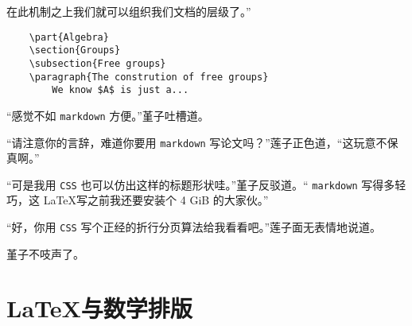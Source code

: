 在此机制之上我们就可以组织我们文档的层级了。”

\begin{lstlisting}
    \part{Algebra}
    \section{Groups}
    \subsection{Free groups}
    \paragraph{The constrution of free groups}
        We know $A$ is just a...
\end{lstlisting}


“感觉不如 \verb"markdown" 方便。”堇子吐槽道。

“请注意你的言辞，难道你要用 \verb"markdown" 写论文吗？”莲子正色道，“这玩意不保真啊。”

“可是我用 \verb"CSS" 也可以仿出这样的标题形状哇。”堇子反驳道。“ \verb"markdown" 写得多轻巧，这 \LaTeX 写之前我还要安装个 4 GiB 的大家伙。”

“好，你用 \verb"CSS" 写个正经的折行分页算法给我看看吧。”莲子面无表情地说道。

堇子不吱声了。

\section{\LaTeX 与数学排版}

